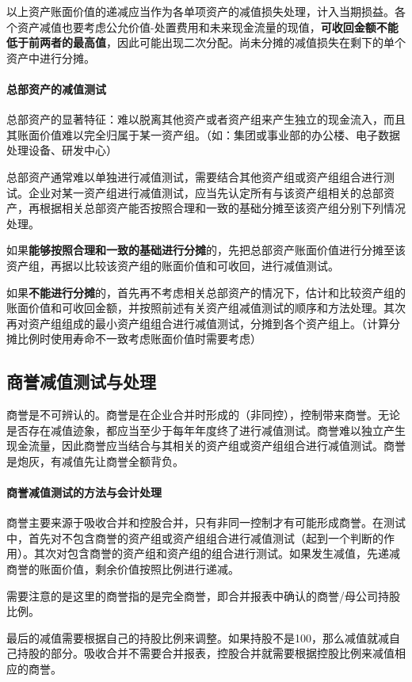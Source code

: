\documentclass[UTF8,12pt]{ctexart}
\numberwithin{equation}{section} %
\numberwithin{figure}{section}
\numberwithin{table}{section}
\begin{document}
	以上资产账面价值的递减应当作为各单项资产的减值损失处理，计入当期损益。各个资产减值也要考虑公允价值-处置费用和未来现金流量的现值，\textbf{可收回金额不能低于前两者的最高值}，因此可能出现二次分配。尚未分摊的减值损失在剩下的单个资产中进行分摊。 
	
	\paragraph{总部资产的减值测试}
	总部资产的显著特征：难以脱离其他资产或者资产组来产生独立的现金流入，而且其账面价值难以完全归属于某一资产组。（如：集团或事业部的办公楼、电子数据处理设备、研发中心）
	
	总部资产通常难以单独进行减值测试，需要结合其他资产组或资产组组合进行测试。企业对某一资产组进行减值测试，应当先认定所有与该资产组相关的总部资产，再根据相关总部资产能否按照合理和一致的基础分摊至该资产组分别下列情况处理。
	
	如果\textbf{能够按照合理和一致的基础进行分摊}的，先把总部资产账面价值进行分摊至该资产组，再据以比较该资产组的账面价值和可收回，进行减值测试。
	
	如果\textbf{不能进行分摊}的，首先再不考虑相关总部资产的情况下，估计和比较资产组的账面价值和可收回金额，并按照前述有关资产组减值测试的顺序和方法处理。其次再对资产组组成的最小资产组组合进行减值测试，分摊到各个资产组上。（计算分摊比例时使用寿命不一致考虑账面价值时需要考虑）
	
	\subsection{商誉减值测试与处理}
	商誉是不可辨认的。商誉是在企业合并时形成的（非同控），控制带来商誉。无论是否存在减值迹象，都应当至少于每年年度终了进行减值测试。商誉难以独立产生现金流量，因此商誉应当结合与其相关的资产组或资产组组合进行减值测试。商誉是炮灰，有减值先让商誉全额背负。
	
	\paragraph{商誉减值测试的方法与会计处理}
	商誉主要来源于吸收合并和控股合并，只有非同一控制才有可能形成商誉。在测试中，首先对不包含商誉的资产组或资产组组合进行减值测试（起到一个判断的作用）。其次对包含商誉的资产组和资产组的组合进行测试。如果发生减值，先递减商誉的账面价值，剩余价值按照比例进行递减。
	
	需要注意的是这里的商誉指的是完全商誉，即合并报表中确认的商誉/母公司持股比例。
	
	最后的减值需要根据自己的持股比例来调整。如果持股不是100，那么减值就减自己持股的部分。吸收合并不需要合并报表，控股合并就需要根据控股比例来减值相应的商誉。
	
\end{document}
